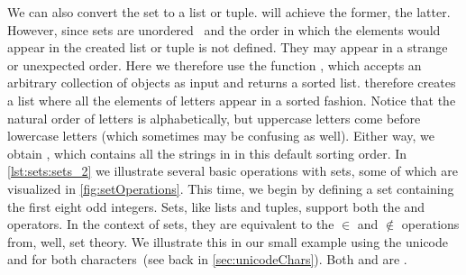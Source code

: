 We can also convert the set  to a list or tuple.
 will achieve the former,  the latter.
However, since sets are unordered~\cite{PSF:P3D:TPSL:STSF,PSF:P3D:TPLR:ST} and the order in which the elements would appear in the created list or tuple is not defined.
They may appear in a strange or unexpected order.
Here we therefore use the function , which accepts an arbitrary collection of objects as input and returns a sorted list.
 therefore creates a list where all the elements of letters appear in a sorted fashion.
Notice that the natural order of letters is alphabetically, but uppercase letters come before lowercase letters (which sometimes may be confusing as well).
Either way, we obtain , which contains all the strings in  in this default sorting order.%
%
%
%
In \cref{lst:sets:sets_2} we illustrate several basic operations with sets, some of which are visualized in \cref{fig:setOperations}.
This time, we begin by defining a set  containing the first eight odd integers.
Sets, like lists and tuples, support both the  and  operators.
In the context of sets, they are equivalent to the $\in$ and $\notin$ operations from, well, set theory.
We illustrate this in our small example using the unicode ~ and  for both characters~(see back in \cref{sec:unicodeChars}).
Both  and  are .%
%
